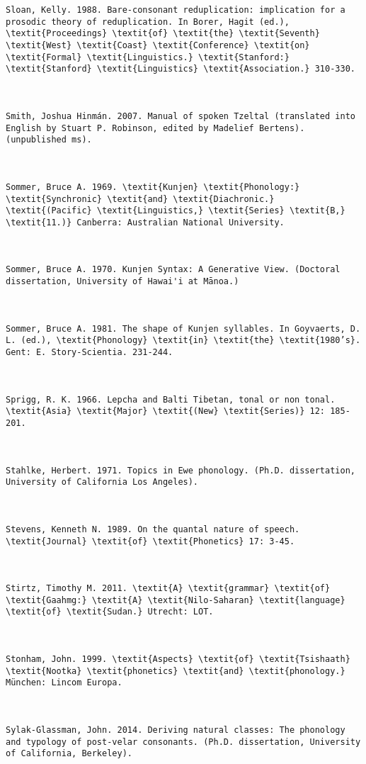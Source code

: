 \begin{verbatim}
Sloan, Kelly. 1988. Bare-consonant reduplication: implication for a prosodic theory of reduplication. In Borer, Hagit (ed.), \textit{Proceedings} \textit{of} \textit{the} \textit{Seventh} \textit{West} \textit{Coast} \textit{Conference} \textit{on} \textit{Formal} \textit{Linguistics.} \textit{Stanford:} \textit{Stanford} \textit{Linguistics} \textit{Association.} 310-330.



Smith, Joshua Hinmán. 2007. Manual of spoken Tzeltal (translated into English by Stuart P. Robinson, edited by Madelief Bertens). (unpublished ms).



Sommer, Bruce A. 1969. \textit{Kunjen} \textit{Phonology:} \textit{Synchronic} \textit{and} \textit{Diachronic.} \textit{(Pacific} \textit{Linguistics,} \textit{Series} \textit{B,} \textit{11.)} Canberra: Australian National University.



Sommer, Bruce A. 1970. Kunjen Syntax: A Generative View. (Doctoral dissertation, University of Hawai'i at Mānoa.)



Sommer, Bruce A. 1981. The shape of Kunjen syllables. In Goyvaerts, D. L. (ed.), \textit{Phonology} \textit{in} \textit{the} \textit{1980’s}. Gent: E. Story-Scientia. 231-244.



Sprigg, R. K. 1966. Lepcha and Balti Tibetan, tonal or non tonal. \textit{Asia} \textit{Major} \textit{(New} \textit{Series)} 12: 185-201.



Stahlke, Herbert. 1971. Topics in Ewe phonology. (Ph.D. dissertation, University of California Los Angeles).



Stevens, Kenneth N. 1989. On the quantal nature of speech. \textit{Journal} \textit{of} \textit{Phonetics} 17: 3-45.



Stirtz, Timothy M. 2011. \textit{A} \textit{grammar} \textit{of} \textit{Gaahmg:} \textit{A} \textit{Nilo-Saharan} \textit{language} \textit{of} \textit{Sudan.} Utrecht: LOT.



Stonham, John. 1999. \textit{Aspects} \textit{of} \textit{Tsishaath} \textit{Nootka} \textit{phonetics} \textit{and} \textit{phonology.} München: Lincom Europa.



Sylak-Glassman, John. 2014. Deriving natural classes: The phonology and typology of post-velar consonants. (Ph.D. dissertation, University of California, Berkeley).




\end{verbatim}
